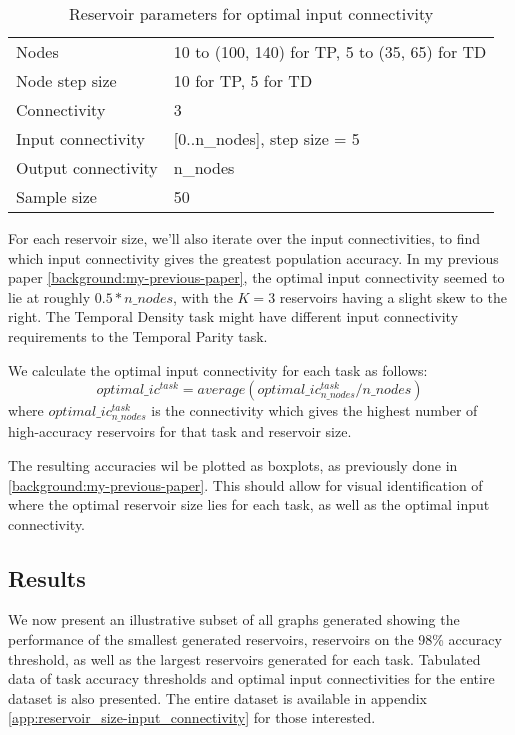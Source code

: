 \begin{table}[ht]
    \centering
    \caption{Reservoir parameters for optimal input connectivity}
    \label{tab:ic-reservoir-parameters}
    \begin{tabular}{ll}
        Nodes               & 10 to (100, 140) for TP, 5 to (35, 65) for TD \\
        Node step size      & 10 for TP, 5 for TD \\
        Connectivity        & 3                              \\
        Input connectivity  & [0..n\_nodes], step size = 5   \\
		Output connectivity & n\_nodes                       \\
        Sample size         & 50
    \end{tabular}
\end{table}

For each reservoir size, we'll also iterate over the input connectivities,
to find which input connectivity gives the greatest population accuracy.
In my previous paper \ref{background:my-previous-paper},
the optimal input connectivity seemed to lie at roughly $ 0.5*n\_nodes $,
with the $K=3$ reservoirs having a slight skew to the right.
The Temporal Density task might have different input connectivity requirements to the Temporal Parity task.

We calculate the optimal input connectivity for each task as follows:
$$ optimal\_ic^{task} = average(optimal\_ic_{n\_nodes}^{task} / n\_nodes) $$
\label{alg:optimal-ic}
where $ optimal\_ic_{n\_nodes}^{task} $ is the connectivity which gives the highest number of high-accuracy reservoirs for that task and reservoir size.

The resulting accuracies wil be plotted as boxplots, as previously done in \ref{background:my-previous-paper}.
This should allow for visual identification of where the optimal reservoir size lies for each task,
as well as the optimal input connectivity.

\subsection{Results}

We now present an illustrative subset of all graphs generated showing the performance of the smallest generated reservoirs,
reservoirs on the 98\% accuracy threshold, as well as the largest reservoirs generated for each task.
Tabulated data of task accuracy thresholds and optimal input connectivities for the entire dataset is also presented.
The entire dataset is available in appendix \ref{app:reservoir_size-input_connectivity} for those interested.


